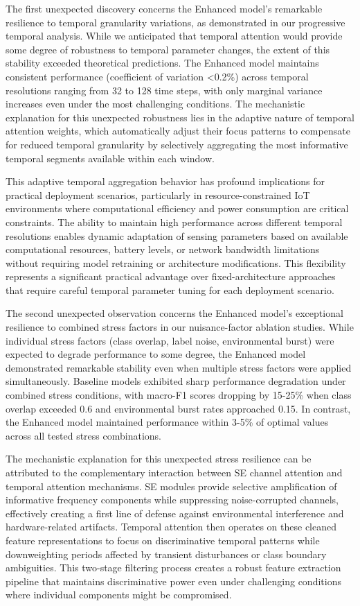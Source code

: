 \documentclass[journal]{IEEEtran}
\begin{document}
The first unexpected discovery concerns the Enhanced model's remarkable resilience to temporal granularity variations, as demonstrated in our progressive temporal analysis. While we anticipated that temporal attention would provide some degree of robustness to temporal parameter changes, the extent of this stability exceeded theoretical predictions. The Enhanced model maintains consistent performance (coefficient of variation <0.2\%) across temporal resolutions ranging from 32 to 128 time steps, with only marginal variance increases even under the most challenging conditions. The mechanistic explanation for this unexpected robustness lies in the adaptive nature of temporal attention weights, which automatically adjust their focus patterns to compensate for reduced temporal granularity by selectively aggregating the most informative temporal segments available within each window.

This adaptive temporal aggregation behavior has profound implications for practical deployment scenarios, particularly in resource-constrained IoT environments where computational efficiency and power consumption are critical constraints. The ability to maintain high performance across different temporal resolutions enables dynamic adaptation of sensing parameters based on available computational resources, battery levels, or network bandwidth limitations without requiring model retraining or architecture modifications. This flexibility represents a significant practical advantage over fixed-architecture approaches that require careful temporal parameter tuning for each deployment scenario.

The second unexpected observation concerns the Enhanced model's exceptional resilience to combined stress factors in our nuisance-factor ablation studies. While individual stress factors (class overlap, label noise, environmental burst) were expected to degrade performance to some degree, the Enhanced model demonstrated remarkable stability even when multiple stress factors were applied simultaneously. Baseline models exhibited sharp performance degradation under combined stress conditions, with macro-F1 scores dropping by 15-25\% when class overlap exceeded 0.6 and environmental burst rates approached 0.15. In contrast, the Enhanced model maintained performance within 3-5\% of optimal values across all tested stress combinations.

The mechanistic explanation for this unexpected stress resilience can be attributed to the complementary interaction between SE channel attention and temporal attention mechanisms. SE modules provide selective amplification of informative frequency components while suppressing noise-corrupted channels, effectively creating a first line of defense against environmental interference and hardware-related artifacts. Temporal attention then operates on these cleaned feature representations to focus on discriminative temporal patterns while downweighting periods affected by transient disturbances or class boundary ambiguities. This two-stage filtering process creates a robust feature extraction pipeline that maintains discriminative power even under challenging conditions where individual components might be compromised.
\end{document}
